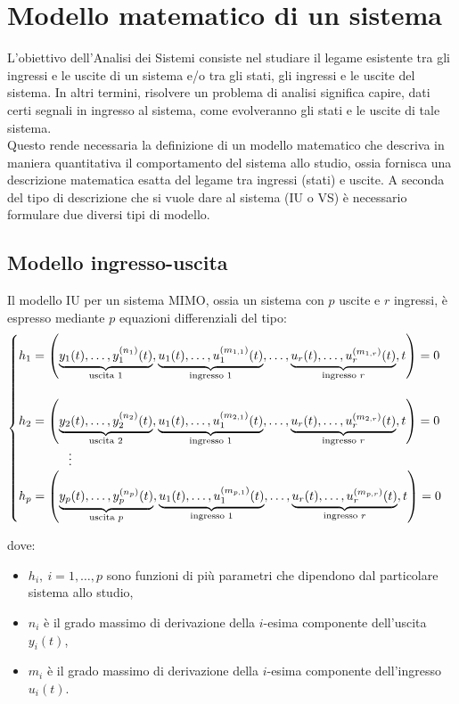 \documentclass[a4paper]{article}
\theoremstyle{definition}
\begin{document}
	\section{Modello matematico di un sistema}
		L'obiettivo dell'Analisi dei Sistemi consiste nel studiare il legame esistente tra gli ingressi e le uscite di un sistema e/o tra gli stati, gli ingressi e le uscite del sistema.
		In altri termini, risolvere un problema di analisi significa capire, dati certi segnali in ingresso al sistema, come evolveranno gli stati e le uscite di tale sistema.\\
		Questo rende necessaria la definizione di un modello matematico che descriva in maniera quantitativa il comportamento del sistema allo studio, ossia fornisca una descrizione matematica esatta del legame tra ingressi (stati) e uscite.
		A seconda del tipo di descrizione che si vuole dare al sistema (IU o VS) è necessario formulare due diversi tipi di modello.
		
		\subsection{Modello ingresso-uscita}
			Il modello IU per un sistema MIMO, ossia un sistema con $ p $ uscite e $ r $ ingressi, è espresso mediante $ p $ equazioni differenziali del tipo:
			\[
				\begin{cases}
					h_1 = \left(\underbrace{ y_1(t), \dots, y_1^{(n_1)}(t) }_{\textup{uscita 1}}, 
						\underbrace{ u_1(t), \dots, u_1^{(m_{1,1})}(t) }_{\textup{ingresso 1}}, \dots,
						\underbrace{ u_r(t), \dots, u_r^{(m_{1,r})}(t) }_{\textup{ingresso }r}, t
					\right) = 0\\ \\
					h_2 = \left(\underbrace{ y_2(t), \dots, y_2^{(n_2)}(t) }_{\textup{uscita 2}}, 
						\underbrace{ u_1(t), \dots, u_1^{(m_{2,1})}(t) }_{\textup{ingresso 1}}, \dots,
						\underbrace{ u_r(t), \dots, u_r^{(m_{2,r})}(t) }_{\textup{ingresso }r}, t
					\right) = 0\\
					\qquad\qquad \vdots \\
					h_p = \left(\underbrace{ y_p(t), \dots, y_p^{(n_p)}(t) }_{\textup{uscita }p}, 
						\underbrace{ u_1(t), \dots, u_1^{(m_{p,1})}(t) }_{\textup{ingresso 1}}, \dots,
						\underbrace{ u_r(t), \dots, u_r^{(m_{p,r})}(t) }_{\textup{ingresso }r}, t
					\right) = 0\\
				\end{cases}
			\]
			
			dove:
			\begin{itemize}
				\item $ h_i,\ i = 1,\dots, p $ sono funzioni di più parametri che dipendono dal particolare
				sistema allo studio,
				\item $ n_i $ è il grado massimo di derivazione della $ i$-esima componente dell'uscita $ y_i(t) $,
				\item $ m_i $ è il grado massimo di derivazione della $ i$-esima componente dell'ingresso $ u_i(t) $.
			\end{itemize}
			
\end{document}
